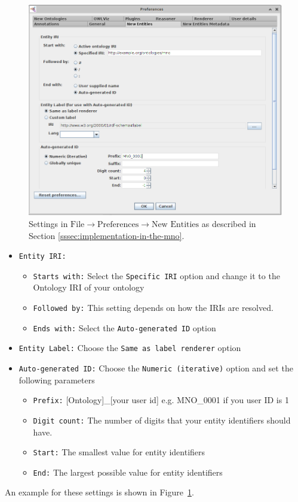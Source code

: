 \begin{figure}
    \centering
    \includegraphics[width=\textwidth]{fig/protege-settings.png}
    \caption{Settings in \textit{$\text{File}\rightarrow\text{Preferences}\rightarrow\text{New Entities}$} as described in Section \ref{sssec:implementation-in-the-mno}.}
    \label{fig:protege-settings}
\end{figure}

\begin{itemize}
    \item \texttt{Entity\ IRI:}
    \begin{itemize}
        \item \texttt{Starts with:} Select the \texttt{Specific\ IRI} option and change it to the Ontology IRI of your ontology
        \item \texttt{Followed by:} This setting depends on how the IRIs are resolved.
        \item \texttt{Ends with:} Select the \texttt{Auto-generated\ ID} option
    \end{itemize}
\item \texttt{Entity Label:} Choose the \texttt{Same as label renderer} option
\item \texttt{Auto-generated ID:}  Choose the \texttt{Numeric (iterative)} option and set the following parameters
\begin{itemize}
    \item \texttt{Prefix:} [Ontology]\_{[}your user id{]} e.g. MNO\_0001 if you user ID is 1
    \item \texttt{Digit count:} The number of digits that your entity identifiers should have.
    \item \texttt{Start:} The smallest value for entity identifiers
    \item \texttt{End:} The largest possible value for entity identifiers
\end{itemize}
\end{itemize}
An example for these settings is shown in Figure~\ref{fig:protege-settings}.
